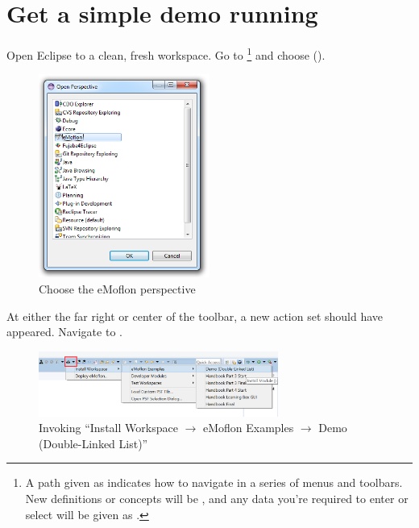 \newpage
\genHeader

\section{Get a simple demo running}


\begin{stepbystep}
\hypertarget{simpleDemo common}{} 
\item
Open Eclipse to a clean, fresh workspace.
Go to  \footnote{A path given as  indicates how to navigate in a series of menus and toolbars.
New definitions or concepts will be , and any data you're required to enter or select will be given as .} and choose  ().

\begin{figure}[htbp]
	\centering
  \includegraphics[width=0.5\textwidth]{../../org.moflon.doc.handbook.01_installation/2_simpleDemo/sd_images/eclipse_openPerspective}
	\caption{Choose the eMoflon perspective}
	\label{eclipse:openPerspective}
\end{figure} 

\item
At either the far right or center of the toolbar, a new action set should have appeared.
Navigate to .
%
\vspace{0.5cm}
\begin{figure}[htbp]
	\centering
  \includegraphics[width= 0.7\textwidth]{../../org.moflon.doc.handbook.01_installation/2_simpleDemo/sd_images/eclipse_MoflonButton}
	\caption{Invoking \enquote{Install Workspace $\to$ eMoflon Examples $\to$ Demo (Double-Linked List)}}
	\label{eclipse:newMetamodel}
\end{figure}


\end{stepbystep}
